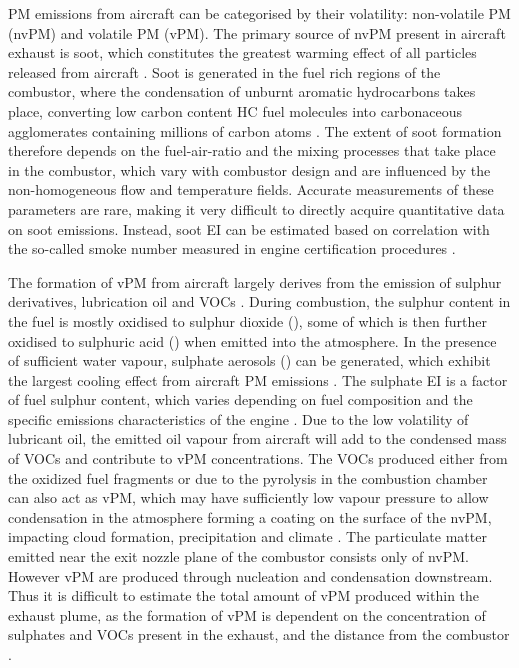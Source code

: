 PM emissions from aircraft can be categorised by their volatility: non-volatile PM (nvPM) and volatile PM (vPM). The primary source of nvPM present in aircraft exhaust is soot, which constitutes the greatest warming effect of all particles released from aircraft \cite{Gettelman2013}. Soot is generated in the fuel rich regions of the combustor, where the condensation of unburnt aromatic hydrocarbons takes place, converting low carbon content HC fuel molecules into carbonaceous agglomerates containing millions of carbon atoms \cite{Ebbinghaus2001, Bockhorn1994}. The extent of soot formation therefore depends on the fuel-air-ratio and the mixing processes that take place in the combustor, which vary with combustor design and are influenced by the non-homogeneous flow and temperature fields. Accurate measurements of these parameters are rare, making it very difficult to directly acquire quantitative data on soot emissions. Instead, soot EI can be estimated based on correlation with the so-called smoke number measured in engine certification procedures \cite{Dopelheuer1998}.

The formation of vPM from aircraft largely derives from the emission of sulphur derivatives, lubrication oil and VOCs \cite{Wayson2012}. During combustion, the sulphur content in the fuel is mostly oxidised to sulphur dioxide (), some of which is then further oxidised to sulphuric acid () when emitted into the atmosphere. In the presence of sufficient water vapour, sulphate aerosols () can be generated, which exhibit the largest cooling effect from aircraft PM emissions \cite{IPCC1999}. The sulphate EI is a factor of fuel sulphur content, which varies depending on fuel composition and the specific emissions characteristics of the engine \cite{Schumann2002}. Due to the low volatility of lubricant oil, the emitted oil vapour from aircraft will add to the condensed mass of VOCs and contribute to vPM concentrations. The VOCs produced either from the oxidized fuel fragments or due to the pyrolysis in the combustion chamber can also act as vPM, which may have sufficiently low vapour pressure to allow condensation in the atmosphere forming a coating on the surface of the nvPM, impacting cloud formation, precipitation and climate \cite{IPCC1999}. The particulate matter emitted near the exit nozzle plane of the combustor consists only of nvPM. However vPM are produced through nucleation and condensation downstream. Thus it is difficult to estimate the total amount of vPM produced within the exhaust plume, as the formation of vPM is dependent on the concentration of sulphates and VOCs present in the exhaust, and the distance from the combustor \cite{Masiol2014}.

